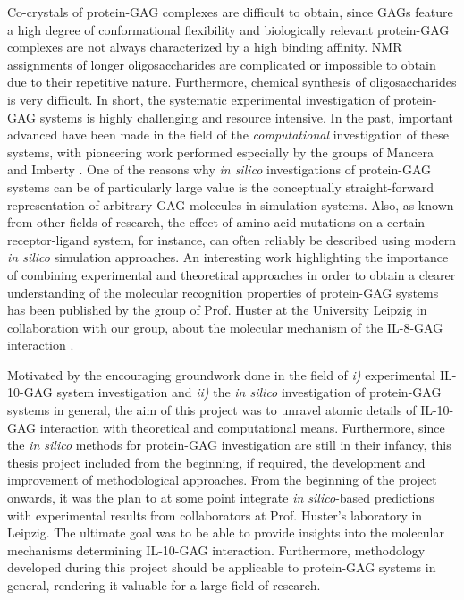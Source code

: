 Co-crystals of protein-GAG complexes are difficult to obtain, since GAGs feature
a high degree of conformational flexibility and biologically relevant
protein-GAG complexes are not always characterized by a high binding affinity.
NMR assignments of longer oligosaccharides are complicated or impossible to
obtain due to their repetitive nature. Furthermore, chemical synthesis of
oligosaccharides is very difficult. In short, the systematic experimental
investigation of protein-GAG systems is highly challenging and resource
intensive. In the past, important advanced have been made in the field of the
\textit{computational} investigation of these systems, with pioneering work
performed especially by the groups of Mancera and Imberty
\cite{imberty_perez_protgag_comp_book_2006, imberty_gag_prot_carbres_2007,
gandhi_structure_2008}. One of the reasons why \textit{in silico} investigations
of protein-GAG systems can be of particularly large value is the conceptually
straight-forward representation of arbitrary GAG molecules in simulation
systems. Also, as known from other fields of research, the effect of amino acid
mutations on a certain receptor-ligand system, for instance, can often reliably
be described using modern \textit{in silico} simulation approaches. An
interesting work highlighting the importance of combining experimental and
theoretical approaches in order to obtain a clearer understanding of the
molecular recognition properties of protein-GAG systems has been published by
the group of Prof. Huster at the University Leipzig in collaboration with our
group, about the molecular mechanism of the IL-8-GAG interaction
\cite{pichert_characterization_2012}.

Motivated by the encouraging groundwork done in the field of \textit{i)}
experimental IL-10-GAG system investigation and \textit{ii)} the \textit{in
silico} investigation of protein-GAG systems in general, the aim of this project
was to unravel atomic details of IL-10-GAG interaction with theoretical and
computational means. Furthermore, since the \textit{in silico} methods for
protein-GAG investigation are still in their infancy, this thesis project
included from the beginning, if required, the development and improvement of
methodological approaches. From the beginning of the project onwards, it was the
plan to at some point integrate \textit{in silico}-based predictions with
experimental results from collaborators at Prof. Huster's laboratory in Leipzig.
The ultimate goal was to be able to provide insights into the molecular
mechanisms determining IL-10-GAG interaction. Furthermore, methodology developed
during this project should be applicable to protein-GAG systems in general,
rendering it valuable for a large field of research.

